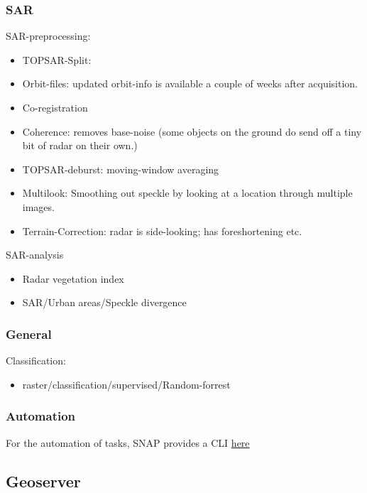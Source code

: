 \subsubsection{SAR}

SAR-preprocessing:
\begin{itemize}
    \item TOPSAR-Split: 
    \item Orbit-files: updated orbit-info is available a couple of weeks after acquisition.
    \item Co-registration
    \item Coherence: removes base-noise (some objects on the ground do send off a tiny bit of radar on their own.)
    \item TOPSAR-deburst: moving-window averaging
    \item Multilook: Smoothing out speckle by looking at a location through multiple images.
    \item Terrain-Correction: radar is side-looking; has foreshortening etc. 
\end{itemize}

SAR-analysis
\begin{itemize}
    \item Radar vegetation index
    \item SAR/Urban areas/Speckle divergence
\end{itemize}

\subsubsection{General}

Classification:
\begin{itemize}
    \item raster/classification/supervised/Random-forrest
\end{itemize}

\subsubsection{Automation}
For the automation of tasks, SNAP provides a CLI \href{http://step.esa.int/docs/tutorials/SNAP_CommandLine_Tutorial.pdf}{here}




\subsection{Geoserver}





